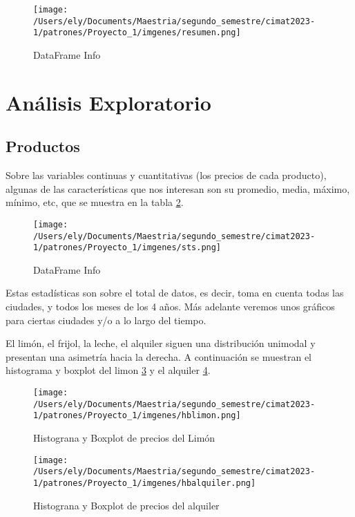\documentclass[letterpaper,spanish,reprint,nofootinbib,showkeys,aps]{revtex4-2}
\begin{document}
\begin{figure} [H]
	\begin{center}
		\texttt{[image: /Users/ely/Documents/Maestria/segundo\_semestre/cimat2023-1/patrones/Proyecto\_1/imgenes/resumen.png]}
		\caption{DataFrame Info}
		\label{res} 
   \end{center} 
\end{figure}


\section{Análisis Exploratorio }

\subsection*{Productos}

Sobre las variables continuas y cuantitativas (los precios de cada producto), algunas de las características que nos interesan son su promedio, media, máximo, mínimo, etc, que se muestra en la tabla \ref{sts}. 

\begin{figure} [H]
	\begin{center}
		\texttt{[image: /Users/ely/Documents/Maestria/segundo\_semestre/cimat2023-1/patrones/Proyecto\_1/imgenes/sts.png]}
		\caption{DataFrame Info}
		\label{sts} 
   \end{center} 
\end{figure}

Estas estadísticas son sobre el total de datos, es decir, toma en cuenta todas las ciudades, y todos los meses de los 4 años. Más adelante veremos unos gráficos para ciertas ciudades y/o a lo largo del tiempo.

El limón, el frijol, la leche, el alquiler siguen una distribución unimodal y presentan una asimetría hacia la derecha. A continuación se muestran el histograma y boxplot del limon \ref{limon} y el alquiler \ref{alquiler}.

\begin{figure} [H]
	\begin{center}
		\texttt{[image: /Users/ely/Documents/Maestria/segundo\_semestre/cimat2023-1/patrones/Proyecto\_1/imgenes/hblimon.png]}
		\caption{Histograna y Boxplot de precios del Limón }
		\label{limon} 
   \end{center} 
\end{figure}

\begin{figure} [H]
	\begin{center}
		\texttt{[image: /Users/ely/Documents/Maestria/segundo\_semestre/cimat2023-1/patrones/Proyecto\_1/imgenes/hbalquiler.png]}
		\caption{Histograna y Boxplot de precios del alquiler }
		\label{alquiler} 
   \end{center} 
\end{figure}
\end{document}
